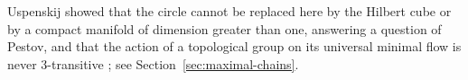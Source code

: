 \begin{remark}[Uspenskij]\label{rem:uspenskij}
Uspenskij showed that the circle cannot be replaced here by the Hilbert cube
or by a compact manifold of dimension greater than one, answering a question of
Pestov, and that the action of a topological group on its universal minimal
flow is never 3-transitive \cite{Uspenskij2000}; see
Section~\ref{sec:maximal-chains}.
\end{remark}
